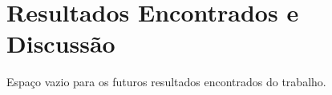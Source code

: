 \chapter{Resultados Encontrados e Discussão}
\label{cap:discussao}

Espaço vazio para os futuros resultados encontrados do trabalho.

